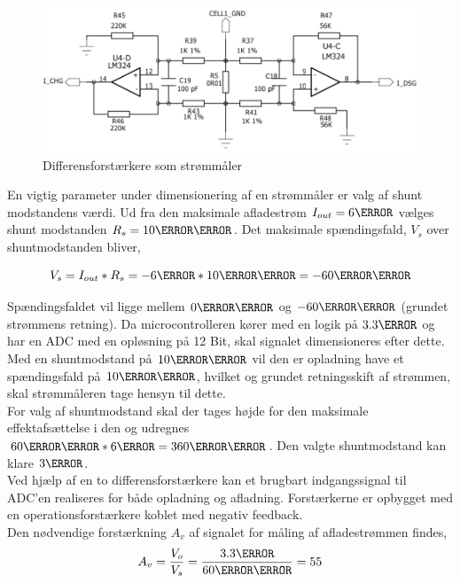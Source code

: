 \begin{figure}[h]
	\centering
	\includegraphics[width=15cm]{billeder/current_meassurement.png}
	\caption{Differensforstærkere som strømmåler}
	\label{fig:current_sense}
\end{figure}

En vigtig parameter under dimensionering af en strømmåler er valg af shunt modstandens værdi. Ud fra den maksimale afladestrøm $I_{out} = 6\ampere$ vælges shunt modstanden $R_{s} = 10\milli\ohm$. Det maksimale spændingsfald, $V_{s}$ over shuntmodstanden bliver,

\begin {equation} 
V_{s} = I_{out} * R_{s}  = -6\ampere * 10\milli\ohm = -60\milli\volt
\end {equation}

Spændingsfaldet vil ligge mellem $0\milli\volt$ og $-60\milli\volt$ (grundet strømmens retning). Da microcontrolleren kører med en logik på $3.3\volt$ og har en ADC med en opløsning på 12 Bit, skal signalet dimensioneres efter dette. Med en shuntmodstand på $10\milli\ohm$ vil den er opladning have et spændingsfald på $10\milli\volt$, hvilket og grundet retningsskift af strømmen, skal strømmåleren tage hensyn til dette.
\\
For valg af shuntmodstand skal der tages højde for den maksimale effektafsættelse i den og udregnes $60\milli\volt * 6\ampere = 360\milli\watt$. Den valgte shuntmodstand kan klare $3\watt$.
\\

Ved hjælp af en to differensforstærkere kan et brugbart indgangssignal til ADC'en realiseres for både opladning og afladning. Forstærkerne er opbygget med en operationsforstærkere koblet med negativ feedback.
\\

Den nødvendige forstærkning $A_{v}$ af signalet for måling af afladestrømmen findes,
\begin {equation} 
A_{v} = \frac{V_{o}}{V_{s}} = \frac{3.3\volt}{60\milli\volt} = 55
\end {equation}


